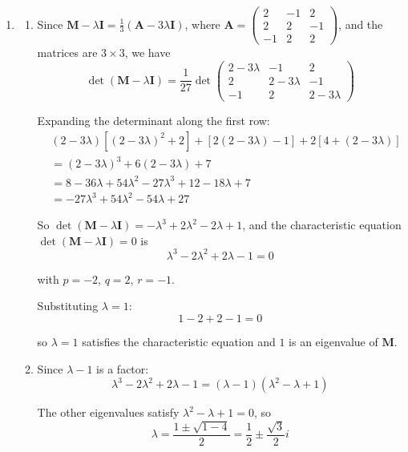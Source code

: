 \documentclass[leqno]{article}
\begin{document}
\begin{enumerate}[
  label=\textbf{\arabic*.},
  leftmargin=*,
  topsep=0pt,
  partopsep=0pt,
  parsep=0pt
]
\vspace*{10pt}

\begin{djsSolution}
\begin{enumerate}[label=\textbf{(\alph*)}, start=1]
  \item
  \begin{enumerate}[label=(\roman*), start=1]
    \item Since \(\mathbf{M}-\lambda\mathbf{I}=\frac{1}{3}\left(\mathbf{A}-3\lambda\mathbf{I}\right)\), where \(\mathbf{A}=\begin{pmatrix} 2 & -1 & 2 \\ 2 & 2 & -1 \\ -1 & 2 & 2 \end{pmatrix}\), and the matrices are \(3\times3\), we have
\[
\det(\mathbf{M}-\lambda\mathbf{I})=\dfrac{1}{27}\det\begin{pmatrix} 2-3\lambda & -1 & 2 \\ 2 & 2-3\lambda & -1 \\ -1 & 2 & 2-3\lambda \end{pmatrix}
\]

Expanding the determinant along the first row:
\begin{align*}
&(2-3\lambda)\left[(2-3\lambda)^2+2\right]+\left[2(2-3\lambda)-1\right]+2\left[4+(2-3\lambda)\right]\\
&=(2-3\lambda)^3+6(2-3\lambda)+7\\
&=8-36\lambda+54\lambda^2-27\lambda^3+12-18\lambda+7\\
&=-27\lambda^3+54\lambda^2-54\lambda+27
\end{align*}

So \(\det(\mathbf{M}-\lambda\mathbf{I})=-\lambda^3+2\lambda^2-2\lambda+1\), and the characteristic equation \(\det(\mathbf{M}-\lambda\mathbf{I})=0\) is
\[
\lambda^3-2\lambda^2+2\lambda-1=0
\]

with \(p=-2\), \(q=2\), \(r=-1\).

Substituting \(\lambda=1\):
\[
1-2+2-1=0
\]

so \(\lambda=1\) satisfies the characteristic equation and \(1\) is an eigenvalue of \(\mathbf{M}\).

    \item Since \(\lambda-1\) is a factor:
\[
\lambda^3-2\lambda^2+2\lambda-1=(\lambda-1)(\lambda^2-\lambda+1)
\]

The other eigenvalues satisfy \(\lambda^2-\lambda+1=0\), so
\[
\lambda=\dfrac{1\pm\sqrt{1-4}}{2}=\dfrac{1}{2}\pm\dfrac{\sqrt{3}}{2}i
\]


\end{enumerate}
\end{enumerate}
\end{djsSolution}
\end{enumerate}
\end{document}
